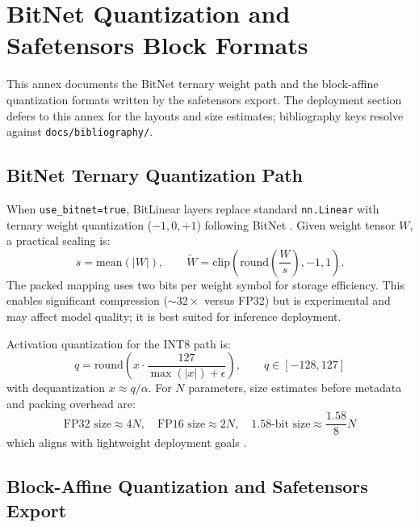 \section{BitNet Quantization and Safetensors Block Formats}
\label{sec:annex-bitnet}

This annex documents the BitNet ternary weight path and the block-affine quantization formats written by the safetensors export. The deployment section defers to this annex for the layouts and size estimates; bibliography keys resolve against \texttt{docs/bibliography/}.

\subsection{BitNet Ternary Quantization Path}

When \texttt{use\_bitnet=true}, BitLinear layers replace standard \texttt{nn.Linear} with ternary weight quantization ($-1, 0, +1$) following BitNet \citep{wang_bitnet_2023}. Given weight tensor $W$, a practical scaling is:
\[
s=\text{mean}(|W|),\qquad
\tilde{W}=\text{clip}\left(\text{round}\left(\frac{W}{s}\right),-1,1\right).
\]
The packed mapping uses two bits per weight symbol for storage efficiency. This enables significant compression ($\sim 32\times$ versus FP32) but is experimental and may affect model quality; it is best suited for inference deployment.

Activation quantization for the INT8 path is:
\[
q=\text{round}\left(x\cdot\frac{127}{\max(|x|)+\epsilon}\right),\qquad q\in[-128,127]
\]
with dequantization $x\approx q/\alpha$. For $N$ parameters, size estimates before metadata and packing overhead are:
\[
\text{FP32 size}\approx 4N,\quad \text{FP16 size}\approx 2N,\quad \text{1.58-bit size}\approx \frac{1.58}{8}N
\]
which aligns with lightweight deployment goals \citep{samson_lightweight_2026,bravin_embbert_2026}.

\subsection{Block-Affine Quantization and Safetensors Export}
\label{sec:annex-block-affine}

